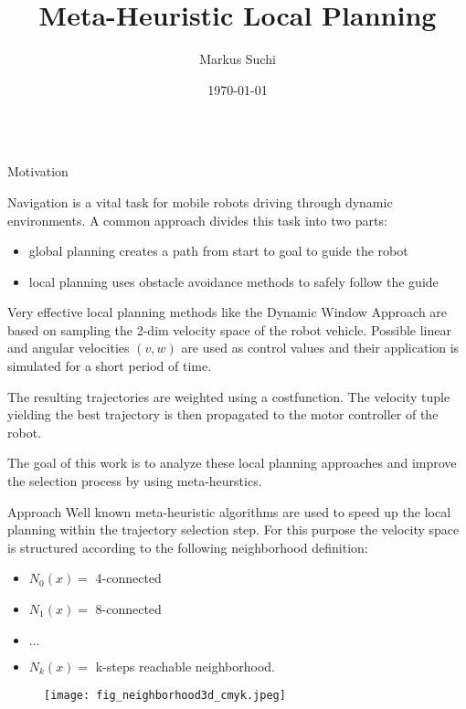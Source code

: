 \documentclass[final,hyperref={pdfpagelabels=true}]{beamer}
\title[Computational Intelligence]{%
  Meta-Heuristic Local Planning \\[0.2\baselineskip]%
}
\author[markus.suchi@tuwien.ac.at]{Markus Suchi}
\institute[]{%
  Technische Universit{\"a}t Wien\\[0.25\baselineskip]
  Institut f{\"u}r Automatisierungs- und Regelungstechnik\\[0.25\baselineskip]
  Betreuer: Ao.Univ.-Prof. Dipl.-Ing. Dr. Markus Vincze
}
\date[\today]{\today}
\begin{document}
\begin{frame}
  \begin{columns}[t]
    \begin{column}{.45\textwidth}
      \begin{block}{Motivation}

        Navigation is a vital task for mobile robots driving through dynamic environments. 
        A common approach divides this task into two parts:
        \begin{itemize}
        \item global planning creates a path from start to goal to guide the robot
        \item local planning uses obstacle avoidance methods to safely follow the guide
        \end{itemize}
       	\begin{figure}
       	 \captionsetup[subfigure]{labelformat=empty} 
       \end{figure}        
       
        Very effective local planning methods like the Dynamic Window Approach \cite{DWA1997} are based on sampling the 2-dim velocity space of the robot vehicle.
        Possible linear and angular velocities $(v,w)$ are used as control values and their application is simulated for a short period of time. 
        
        The resulting trajectories are weighted using a costfunction.
        The velocity tuple yielding the best trajectory is then propagated to the motor controller of the robot.     
        
        The goal of this work is to analyze these local planning approaches and improve the selection process by using meta-heurstics. 
  \end{block}
  
            \begin{block}{Approach}
      Well known meta-heuristic algorithms are used to speed up the local planning within the trajectory selection step.
      For this purpose the velocity space is structured according to the following neighborhood definition:
\begin{itemize}
 \item $N_0(x)=$ 4-connected
 \item $N_1(x)=$ 8-connected
 \item $\dots$
 \item $N_k(x)=$ k-steps reachable neighborhood.
\end{itemize}
       \begin{figure}
          \texttt{[image: fig\_neighborhood3d\_cmyk.jpeg]}     
       \end{figure}


\end{block}
\end{column}
\end{columns}
\end{frame}
\end{document}
